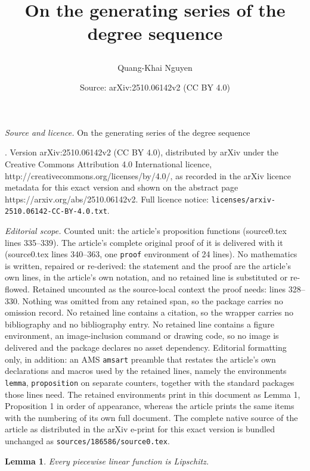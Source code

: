 \documentclass[10pt,a4paper]{amsart}
\title{On the generating series of the degree sequence\date{\vspace{-2\baselineskip}}}
\author{Quang-Khai Nguyen}
\date{Source: arXiv:2510.06142v2 (CC BY 4.0)}
\newtheorem{lemma}{Lemma}
\begin{document}
\maketitle

\noindent\emph{Source and licence.} On the generating series of the degree sequence\date{\vspace{-2\baselineskip}}. Version arXiv:2510.06142v2 (CC BY 4.0), distributed by arXiv under the Creative Commons Attribution 4.0 International licence, http://creativecommons.org/licenses/by/4.0/, as recorded in the arXiv licence metadata for this exact version and shown on the abstract page https://arxiv.org/abs/2510.06142v2. Full licence notice: \texttt{licenses/arxiv-2510.06142-CC-BY-4.0.txt}.\par\smallskip

\noindent\textit{Editorial scope.} Counted unit: the article's proposition functions (source0.tex lines 335--339). The article's complete original proof of it is delivered with it (source0.tex lines 340--363, one \texttt{proof} environment of 24 lines). No mathematics is written, repaired or re-derived: the statement and the proof are the article's own lines, in the article's own notation, and no retained line is substituted or re-flowed.  Retained uncounted as the source-local context the proof needs: lines 328--330.  Nothing was omitted from any retained span, so the package carries no omission record.  No retained line contains a citation, so the wrapper carries no bibliography and no bibliography entry.  No retained line contains a figure environment, an image-inclusion command or drawing code, so no image is delivered and the package declares no asset dependency.  Editorial formatting only, in addition: an AMS \texttt{amsart} preamble that restates the article's own declarations and macros used by the retained lines, namely the environments \texttt{lemma}, \texttt{proposition} on separate counters, together with the standard packages those lines need.  The retained environments print in this document as Lemma 1, Proposition 1 in order of appearance, whereas the article prints the same items with the numbering of its own full document.  The complete native source of the article as distributed in the arXiv e-print for this exact version is bundled unchanged as \texttt{sources/186586/source0.tex}.
\begin{lemma}\label{piecewise linear functions are Lipschitz}
   Every piecewise linear function is Lipschitz.
\end{lemma}
\end{document}
